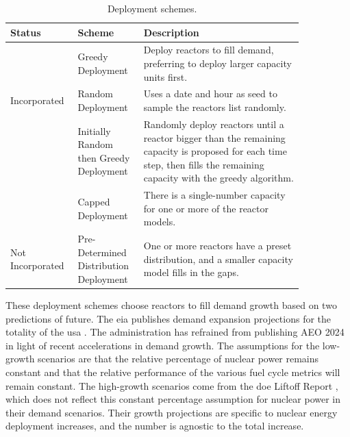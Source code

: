\begin{table}[H]
    \centering
    \caption{Deployment schemes.}
    \label{tab:deployment_schemes}
    \begin{tabular}{p{0.15\linewidth} >{\raggedright}p{0.20\linewidth}>{\raggedright\arraybackslash}p{0.50\linewidth}}
        \hline
        Status & Scheme & Description \\
        \hline
        & Greedy Deployment & Deploy reactors to fill demand, preferring to deploy larger capacity units first. \\
        Incorporated & Random Deployment & Uses a date and hour as seed to sample the
        reactors list randomly. \\
        & Initially Random then Greedy Deployment & Randomly deploy reactors until
        a reactor bigger than the remaining capacity is proposed for each time step,
        then fills the remaining capacity with the greedy algorithm. \\
        \hline
         & Capped Deployment & There is a
        single-number capacity for one or more of the reactor models. \\
        Not Incorporated & Pre-Determined Distribution Deployment & One or more reactors have a
        preset distribution, and a smaller capacity model fills in the gaps. \\
        \hline
    \end{tabular}
\end{table}

These deployment schemes choose reactors to fill demand growth based on two predictions of future. The \gls{eia} publishes demand expansion projections for the totality of the \gls{usa} \cite{eia_aeo_2023}. The administration has refrained from publishing AEO 2024 in light of recent accelerations in demand growth. The assumptions for the low-growth scenarios are that the relative percentage of nuclear power remains constant and that the relative performance of the various fuel cycle metrics will remain constant. The high-growth scenarios come from the \gls{doe} Liftoff Report \cite{julie_liftoff_pathways_2024}, which does not reflect this constant percentage assumption for nuclear power in their demand scenarios. Their growth projections are specific to nuclear energy deployment increases, and the number is agnostic to the total increase.

